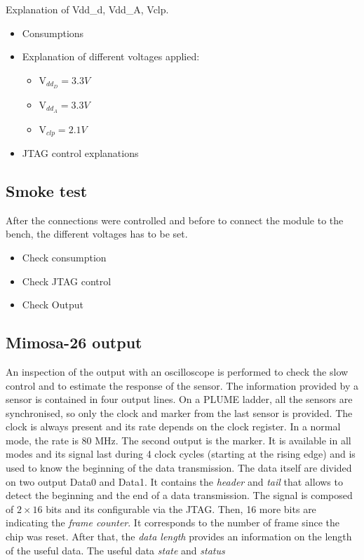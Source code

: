   Explanation of Vdd\_d, Vdd\_A, Vclp.
  \begin{itemize}
    \item Consumptions
    \item Explanation of different voltages applied:
    \begin{itemize}
      \item $\text{V}_{dd_D} = 3.3V $
      \item $\text{V}_{dd_A} = 3.3V $
      \item $\text{V}_{clp} = 2.1V $
    \end{itemize}
    \item JTAG control explanations
  \end{itemize}

  \subsection{Smoke test}

  After the connections were controlled and before to connect the module to the bench, the different voltages has to be set.

  \begin{itemize}
    \item Check consumption
    \item Check JTAG control
    \item Check Output
  \end{itemize}

  \subsection{Mimosa-26 output}

  An inspection of the output with an oscilloscope is performed to check the slow control and to estimate the response of the sensor.
  The information provided by a sensor is contained in four output lines.
  On a PLUME ladder, all the sensors are synchronised, so only the clock and marker from the last sensor is provided.
  The clock is always present and its rate depends on the clock register. 
  In a normal mode, the rate is 80 MHz.
  The second output is the marker. 
  It is available in all modes and its signal last during 4 clock cycles (starting at the rising edge) and is used to know the beginning of the data transmission.
  The data itself are divided on two output Data0 and Data1. 
  It contains the \textit{header} and \textit{tail} that allows to detect the beginning and the end of a data transmission.
  The signal is composed of $2 \times 16$ bits and its configurable via the \gls{JTAG}.
  Then, 16 more bits are indicating the \textit{frame counter}.
  It corresponds to the number of frame since the chip was reset.
  After that, the \textit{data length} provides an information on the length of the useful data.
  The useful data \textit{state} and \textit{status}


